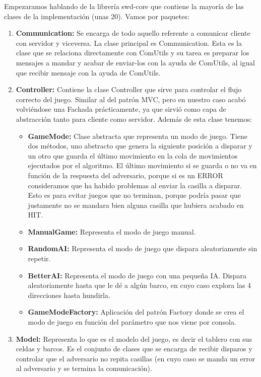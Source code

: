 Empezaramos hablando de la librería swd-core que contiene la mayoría de las clases de la implementación (unas 20). Vamos por paquetes:
\begin{enumerate}
\item \textbf{Communication:} Se encarga de todo aquello referente a comunicar cliente con servidor y viceversa. La clase principal es Communication. Esta es la clase que se relaciona directamente con ComUtils y su tarea es preparar los mensajes a mandar y acabar de enviar-los con la ayuda de ComUtils, al igual que recibir mensaje con la ayuda de ComUtils.
\item \textbf{Controller:} Contiene la clase Controller que sirve para controlar el flujo correcto del juego. Similar al del patrón MVC, pero en nuestro caso acabó volviéndose una Fachada prácticamente, ya que sirvió como capa de abstracción tanto para cliente como servidor. Además de esta clase tenemos:
	\begin{itemize}
	\item \textbf{GameMode:} Clase abstracta que representa un modo de juego. Tiene dos métodos, uno abstracto que genera la siguiente posición a disparar y un otro que guarda el último movimiento en la cola de movimientos ejecutados por el algoritmo. El último movimiento si se guarda o no va en función de la respuesta del adversario, porque si es un ERROR consideramos que ha habido problemas al enviar la casilla a disparar. Esto es para evitar juegos que no terminan, porque podría pasar que justamente no se mandara bien alguna casilla que hubiera acabado en HIT.
	\item \textbf{ManualGame:} Representa el modo de juego manual.
	\item \textbf{RandomAI:} Representa el modo de juego que dispara aleatoriamente sin repetir.
	\item \textbf{BetterAI:} Representa el modo de juego con una pequeña IA. Dispara aleatoriamente hasta que le dé a algún barco, en cuyo caso explora las 4 direcciones hasta hundirla.
	\item \textbf{GameModeFactory:} Aplicación del patrón Factory donde se crea el modo de juego en función del parámetro que nos viene por consola.
	\end{itemize}
\item \textbf{Model:} Representa lo que es el modelo del juego, es decir el tablero con sus celdas y barcos. Es el conjunto de clases que se encarga de recibir disparos y controlar que el adversario no repita casillas (en cuyo caso se manda un error al adversario y se termina la comunicación).

\end{enumerate}
